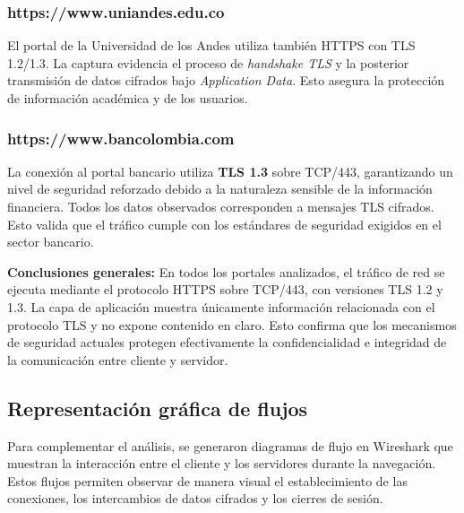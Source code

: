 \documentclass[10pt]{article}
\begin{document}
\subsubsection{https://www.uniandes.edu.co}
El portal de la Universidad de los Andes utiliza también HTTPS con TLS 1.2/1.3. 
La captura evidencia el proceso de \textit{handshake TLS} y la posterior transmisión de datos cifrados bajo \textit{Application Data}. 
Esto asegura la protección de información académica y de los usuarios.

\subsubsection{https://www.bancolombia.com}
La conexión al portal bancario utiliza \textbf{TLS 1.3} sobre TCP/443, garantizando un nivel de seguridad reforzado debido a la naturaleza sensible de la información financiera. 
Todos los datos observados corresponden a mensajes TLS cifrados. 
Esto valida que el tráfico cumple con los estándares de seguridad exigidos en el sector bancario.

\noindent
\textbf{Conclusiones generales:} 
En todos los portales analizados, el tráfico de red se ejecuta mediante el protocolo HTTPS sobre TCP/443, con versiones TLS 1.2 y 1.3. 
La capa de aplicación muestra únicamente información relacionada con el protocolo TLS y no expone contenido en claro. 
Esto confirma que los mecanismos de seguridad actuales protegen efectivamente la confidencialidad e integridad de la comunicación entre cliente y servidor.


\subsection*{Representación gráfica de flujos}

Para complementar el análisis, se generaron diagramas de flujo en Wireshark que muestran la interacción entre el cliente y los servidores durante la navegación. 
Estos flujos permiten observar de manera visual el establecimiento de las conexiones, los intercambios de datos cifrados y los cierres de sesión.
\end{document}
